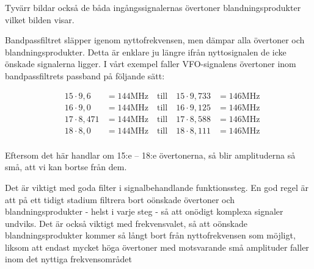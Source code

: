 Tyvärr bildar också de båda ingångssignalernas övertoner
blandningsprodukter vilket bilden visar.

Bandpassfiltret släpper igenom nyttofrekvensen, men dämpar alla
övertoner och blandningsprodukter. Detta är enklare ju längre ifrån
nyttosignalen de icke önskade signalerna ligger. I vårt exempel faller
VFO-signalens övertoner inom bandpassfiltrets passband på följande
sätt:

\begin{align*}
  &15 \cdot 9,6   &= 144 \text{MHz} \quad \text{till} \quad 15 \cdot 9,733 &= 146 \text{MHz} \\
  &16 \cdot 9,0   &= 144 \text{MHz} \quad \text{till} \quad 16 \cdot 9,125 &= 146 \text{MHz} \\
  &17 \cdot 8,471 &= 144 \text{MHz} \quad \text{till} \quad 17 \cdot 8,588 &= 146 \text{MHz} \\
  &18 \cdot 8,0   &= 144 \text{MHz} \quad \text{till} \quad 18 \cdot 8,111 &= 146 \text{MHz} \\
\end{align*}


Eftersom det här handlar om 15:e -- 18:e övertonerna, så blir
amplituderna så små, att vi kan bortse från dem.

Det är viktigt med goda filter i signalbehandlande funktionssteg. En
god regel är att på ett tidigt stadium filtrera bort oönskade
övertoner och blandningsprodukter - helst i varje steg - så att
onödigt komplexa signaler undviks. Det är också viktigt med
frekvensvalet, så att oönskade blandningsprodukter kommer så långt
bort från nyttofrekvensen som möjligt, liksom att endast mycket höga
övertoner med motsvarande små amplituder faller inom det nyttiga
frekvensområdet
